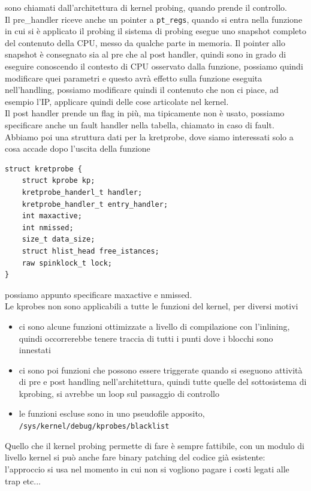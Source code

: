 \documentclass[12pt, oneside]{extbook}
\begin{document}
sono chiamati dall'architettura di kernel probing, quando prende il controllo.\\Il pre\_handler riceve anche un pointer a \texttt{pt\_regs}, quando si entra nella funzione in cui si è applicato il probing il sistema di probing esegue uno snapshot completo del contenuto della CPU, messo da qualche parte in memoria. Il pointer allo snapshot è consegnato sia al pre che al post handler, quindi sono in grado di eseguire conoscendo il contesto di CPU osservato dalla funzione, possiamo quindi modificare quei parametri e questo avrà effetto sulla funzione eseguita nell'handling, possiamo modificare quindi il contenuto che non ci piace, ad esempio l'IP, applicare quindi delle cose articolate nel kernel.\\Il post handler prende un flag in più, ma tipicamente non è usato, possiamo specificare anche un fault handler nella tabella, chiamato in caso di fault.\\Abbiamo poi una struttura dati per la kretprobe, dove siamo interessati solo a cosa accade dopo l'uscita della funzione
\begin{lstlisting}
struct kretprobe {
	struct kprobe kp;
	kretprobe_handerl_t handler;
	kretprobe_handler_t entry_handler;
	int maxactive;
	int nmissed;
	size_t data_size;
	struct hlist_head free_istances;
	raw spinklock_t lock;
}
\end{lstlisting}
possiamo appunto specificare maxactive e nmissed.\\Le kprobes non sono applicabili a tutte le funzioni del kernel, per diversi motivi
\begin{itemize}
\item ci sono alcune funzioni ottimizzate a livello di compilazione con l'inlining, quindi occorrerebbe tenere traccia di tutti i punti dove i blocchi sono innestati
\item ci sono poi funzioni che possono essere triggerate quando si eseguono attività di pre e post handling nell'architettura, quindi tutte quelle del sottosistema di kprobing, si avrebbe un loop sul passaggio di controllo
\item le funzioni escluse sono in uno pseudofile apposito, \texttt{/sys/kernel/debug/kprobes/blacklist}
\end{itemize}
Quello che il kernel probing permette di fare è sempre fattibile, con un modulo di livello kernel si può anche fare binary patching del codice già esistente: l'approccio si usa nel momento in cui non si vogliono pagare i costi legati alle trap etc...
\end{document}
